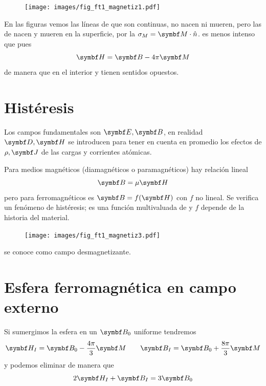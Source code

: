 \documentclass[10pt,oneside]{CBFT_book}
\begin{document}
\begin{figure}[htb]
	\begin{center}
	\texttt{[image: images/fig\_ft1\_magnetiz1.pdf]}	 
	\end{center}
	\caption{}
\end{figure} 

En las figuras vemos las líneas de  que son continuas, no nacen ni mueren, pero las
de  nacen y mueren en la superficie, por la $\sigma_M = \vb{M}\cdot\hat{n}$.
 es menos intenso que  pues
\[
	\vb{H} = \vb{B} - 4\pi \vb{M}
\]
de manera que en el interior  y  tienen sentidos opuestos.

\section{Histéresis}

Los campos fundamentales son $\vb{E},\vb{B}$, en realidad $\vb{D},\vb{H}$ se introducen para tener
en cuenta en promedio los efectos de $\rho, \vb{J}$ de las cargas y corrientes atómicas.

Para medios magnéticos (diamagnéticos o paramagnéticos) hay relación lineal
\[
	\vb{B} = \mu \vb{H}
\]
pero para ferromagnéticos es $\vb{B} = f(\vb{H})$ con $f$ no lineal. Se verifica un fenómeno
de histéresis;  es una función multivaluada de  y $f$ depende de la historia del material.

\begin{figure}[htb]
	\begin{center}
	\texttt{[image: images/fig\_ft1\_magnetiz3.pdf]}	 
	\end{center}
	\caption{}
\end{figure} 

 se conoce como campo desmagnetizante.


\section{Esfera ferromagnética en campo externo}

Si sumergimos la esfera en un $\vb{B}_0$ uniforme tendremos
\[
	\vb{H}_I = \vb{B}_0 - \frac{4\pi}{3} \vb{M} \qquad \vb{B}_I = \vb{B}_0 + \frac{8\pi}{3} \vb{M}
\]
y podemos eliminar  de manera que 
\[
	2\vb{H}_I + \vb{B}_I = 3\vb{B}_0
\]
\end{document}
